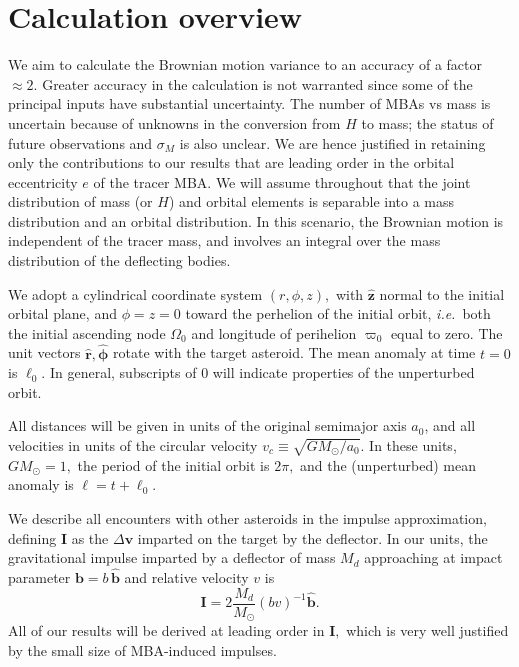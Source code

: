 \documentclass[linenumbers, onecolumn]{aastex631}
\newcommand{\ie}{\textit{i.e.\/}}
\newcommand{\vecI}{\mathbf{I}}
\newcommand{\vecb}{\mathbf{b}}
\newcommand{\bhat}{\mathbf{\hat b}}
\newcommand{\rhat}{\mathbf{\hat r}}
\newcommand{\phat}{\boldsymbol{\hat\phi}}
\newcommand{\zhat}{\mathbf{\hat z}}
\newcommand{\vecv}{\mathbf{v}}
\newcommand{\vcirc}{v_c}
\newcommand{\Msun}{M_\odot}
\newcommand{\lop}{\varpi}   %
\newcommand{\ma}{\ell}  %
\begin{document}
\section{Calculation overview}
We aim to calculate the Brownian motion variance to an accuracy of a
factor $\approx 2.$
Greater accuracy in the calculation is not warranted
since some of the principal inputs have substantial uncertainty.  The
number of MBAs vs mass is 
uncertain because of unknowns in the conversion
from $H$ to mass; the status of future observations and $\sigma_M$ is
also unclear.  We are hence justified in retaining only the
contributions to our results that are leading
order in the orbital eccentricity $e$ of the tracer MBA.
We will assume throughout that the joint
distribution of mass (or $H$) and orbital elements is separable into a
mass distribution and an orbital distribution.  In this scenario, the
Brownian motion is independent of the tracer mass, and involves an
integral over the mass distribution of the deflecting bodies.

We adopt a cylindrical coordinate system $(r,\phi,z),$ with $\zhat$
normal to the initial orbital plane, and $\phi=z=0$ toward the
perhelion of the initial orbit, \ie\ both the initial ascending node
$\Omega_0$ and longitude of perihelion $\lop_0$ equal to zero.  The
unit vectors $\rhat, \phat$ rotate with the target asteroid.  The mean
anomaly at time $t=0$ is $\ma_0.$  In general, subscripts of $0$ will
indicate properties of the unperturbed orbit.

All distances will be given in units of the original semimajor axis $a_0$, and all velocities in units of the circular velocity $\vcirc \equiv \sqrt{G\Msun/a_0}.$  In these units, $G\Msun=1,$ the period of the initial orbit is $2\pi,$ and the (unperturbed) mean anomaly is $\ma=t+\ma_0.$ 

We describe all encounters with other asteroids in the impulse approximation, defining $\vecI$ as the $\Delta\vecv$ imparted on the target by the deflector.
In our units, the gravitational impulse imparted by a deflector of mass $M_d$ approaching at impact parameter $\vecb=b\,\bhat$ and relative velocity $v$ is
\begin{equation}
  \vecI = 2 \frac{M_d}{\Msun} (bv)^{-1} \bhat.
  \label{eq:impulse}
\end{equation}
All of our results will be derived at leading order in $\vecI,$ which
is very well justified by the small size of MBA-induced impulses.
\end{document}
